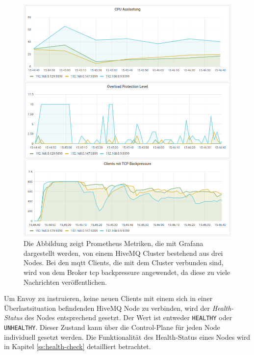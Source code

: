 \begin{figure}
    \centering
    \includegraphics[scale=0.8]{images/overload-protection.png}
    \caption{Die Abbildung zeigt Prometheus Metriken, die mit Grafana dargestellt werden, von einem HiveMQ Cluster bestehend aus drei Nodes. Bei den \ac{mqtt} Clients, die mit dem Cluster verbunden sind, wird von dem Broker \ac{tcp} backpressure angewendet, da diese zu viele Nachrichten veröffentlichen.}
    \label{fig:overload-protection}
\end{figure}
Um Envoy zu instruieren, keine neuen Clients mit einem sich in einer Überlastsituation befindenden HiveMQ Node zu verbinden, wird der \textit{Health-Status} des Nodes entsprechend gesetzt.
Der Wert ist entweder \verb|HEALTHY| oder \verb|UNHEALTHY|.
Dieser Zustand kann über die Control-Plane für jeden Node individuell gesetzt werden.
\cite{HealthCheckEnvoy}
Die Funktionalität des Health-Status eines Nodes wird in Kapitel \ref{ss:health-check} detailliert betrachtet.
\newpage


